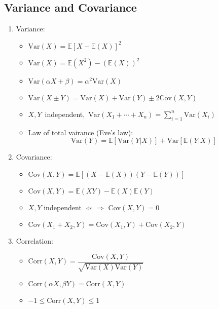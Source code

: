 \documentclass[%
 aip,
 jmp,%
 amsmath,amssymb,
 reprint,%
]{revtex4-1}
\def\E{\mathbb{E}}
\def\Var{\mathrm{Var}}
\def\Cov{\mathrm{Cov}}
\def\Corr{\mathrm{Corr}}
\begin{document}
\subsection{Variance and Covariance}
\begin{enumerate}
    \item Variance:
        \begin{itemize}
            \item $\Var(X) = \E[X - \E(X)]^2$
            \item $\Var(X) = \E(X^2) - (\E(X))^2$
            \item $\Var(\alpha X + \beta) = \alpha^2 \Var(X)$
            \item $\Var(X\pm Y) = \Var(X) + \Var(Y) \pm 2\Cov(X,Y)$
            \item \mbox{$X,Y$ independent, $\Var(X_1+\cdots+X_n) = \sum_{i=1}^n \Var(X_i)$}
            \item Law of total vairance (Eve's law):
            $$ \Var(Y) = \E[\Var(Y|X)] + \Var[\E(Y|X)]$$
        \end{itemize}

    \item Covariance:
        \begin{itemize}
            \item $\Cov(X,Y) = \E[(X - \E(X))(Y - \E(Y))]$
            \item $\Cov(X,Y) = \E(XY) - \E(X)\E(Y)$
            \item $X,Y$ independent $\not\Leftarrow\Rightarrow$ $\Cov(X,Y)=0$
            \item $\Cov(X_1+X_2,Y)=\Cov(X_1,Y)+\Cov(X_2,Y)$
        \end{itemize}

    \item Correlation:
        \begin{itemize}
            \item $\Corr(X,Y) = \dfrac{\Cov(X,Y)}{\sqrt{\Var(X)\Var(Y)}}$
            \item $\Corr(\alpha X, \beta Y) = \Corr(X,Y)$
            \item $-1 \le \Corr(X,Y) \le 1$
        \end{itemize}

\end{enumerate}
\end{document}
